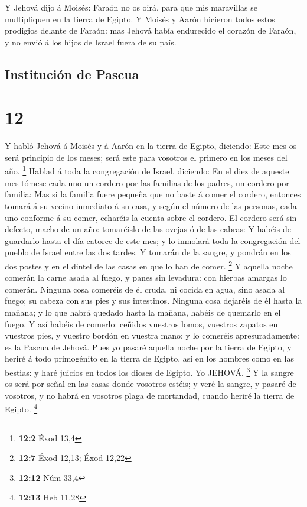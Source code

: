  Y Jehová dijo á Moisés: Faraón no os oirá, para que mis
maravillas se multipliquen en la tierra de Egipto.  Y
Moisés y Aarón hicieron todos estos prodigios delante de Faraón: mas
Jehová había endurecido el corazón de Faraón, y no envió á los hijos de
Israel fuera de su país.

\hypertarget{instituciuxf3n-de-pascua}{%
\subsection{Institución de Pascua}\label{instituciuxf3n-de-pascua}}

\hypertarget{section-11}{%
\section{12}\label{section-11}}

 Y habló Jehová á Moisés y á Aarón en la tierra de Egipto,
diciendo:  Este mes os será principio de los meses; será
este para vosotros el primero en los meses del año. \footnote{\textbf{12:2}
  Éxod 13,4}  Hablad á toda la congregación de Israel,
diciendo: En el diez de aqueste mes tómese cada uno un cordero por las
familias de los padres, un cordero por familia:  Mas si la
familia fuere pequeña que no baste á comer el cordero, entonces tomará á
su vecino inmediato á su casa, y según el número de las personas, cada
uno conforme á su comer, echaréis la cuenta sobre el cordero.
 El cordero será sin defecto, macho de un año: tomaréislo
de las ovejas ó de las cabras:  Y habéis de guardarlo
hasta el día catorce de este mes; y lo inmolará toda la congregación del
pueblo de Israel entre las dos tardes.  Y tomarán de la
sangre, y pondrán en los dos postes y en el dintel de las casas en que
lo han de comer. \footnote{\textbf{12:7} Éxod 12,13; Éxod 12,22}
 Y aquella noche comerán la carne asada al fuego, y panes
sin levadura: con hierbas amargas lo comerán.  Ninguna
cosa comeréis de él cruda, ni cocida en agua, sino asada al fuego; su
cabeza con sus pies y sus intestinos.  Ninguna cosa
dejaréis de él hasta la mañana; y lo que habrá quedado hasta la mañana,
habéis de quemarlo en el fuego.  Y así habéis de comerlo:
ceñidos vuestros lomos, vuestros zapatos en vuestros pies, y vuestro
bordón en vuestra mano; y lo comeréis apresuradamente: es la Pascua de
Jehová.  Pues yo pasaré aquella noche por la tierra de
Egipto, y heriré á todo primogénito en la tierra de Egipto, así en los
hombres como en las bestias: y haré juicios en todos los dioses de
Egipto. Yo JEHOVÁ. \footnote{\textbf{12:12} Núm 33,4}  Y
la sangre os será por señal en las casas donde vosotros estéis; y veré
la sangre, y pasaré de vosotros, y no habrá en vosotros plaga de
mortandad, cuando heriré la tierra de Egipto. \footnote{\textbf{12:13}
  Heb 11,28}

